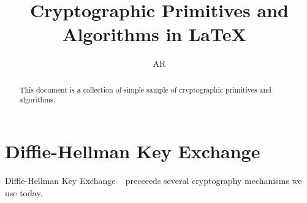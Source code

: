 \documentclass[a4paper, 9pt, english]{article}
\begin{document}
\linespread{1.0}
\title{Cryptographic Primitives and Algorithms in \LaTeX ~}
\author{AR}
\maketitle

\begin{abstract}
This document is a collection of simple sample of cryptographic primitives and algorithms.
\end{abstract}

\section{Diffie-Hellman Key Exchange}\label{sec:diffie-hellman-key-exchange}
Diffie-Hellman Key Exchange ~\cite{diffie2022new}  preceeeds several cryptography mechanisms we use today.
\end{document}
